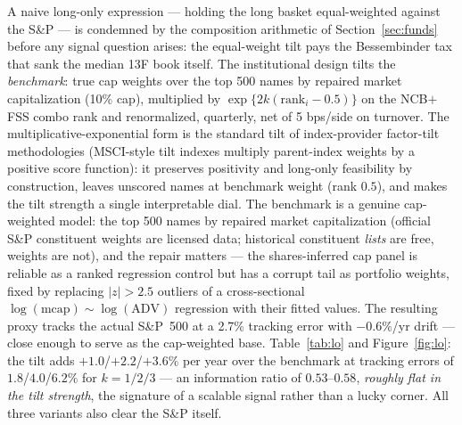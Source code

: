 A naive long-only expression --- holding the long basket
equal-weighted against the S\&P --- is condemned by the composition
arithmetic of Section~\ref{sec:funds} before any signal question
arises: the equal-weight tilt pays the Bessembinder tax that sank
the median 13F book itself. The institutional design tilts the
\emph{benchmark}: true cap weights over the top 500 names by
repaired market capitalization (10\% cap), multiplied by
$\exp\{2k(\mathrm{rank}_i - 0.5)\}$ on the NCB$+$FSS combo rank and
renormalized, quarterly, net of 5 bps/side on turnover. The
multiplicative-exponential form is the standard tilt of
index-provider factor-tilt methodologies (MSCI-style tilt indexes
multiply parent-index weights by a positive score function): it
preserves positivity and long-only feasibility by construction,
leaves unscored names at benchmark weight (rank $0.5$), and makes
the tilt strength a single interpretable dial.
The benchmark is a genuine cap-weighted model: the top 500 names by
repaired market capitalization (official S\&P constituent weights are
licensed data; historical constituent \emph{lists} are free, weights
are not), and the repair matters --- the shares-inferred cap panel
is reliable as a ranked regression control but has a corrupt tail as
portfolio weights, fixed by replacing $|z|>2.5$ outliers of a
cross-sectional $\log(\mathrm{mcap})\sim\log(\mathrm{ADV})$
regression with their fitted values. The resulting proxy tracks the
actual S\&P~500 at a 2.7\% tracking error with $-0.6\%$/yr drift ---
close enough to serve as the cap-weighted base. Table~\ref{tab:lo}
and Figure~\ref{fig:lo}: the tilt adds $+1.0$/$+2.2$/$+3.6\%$ per
year over the benchmark at tracking errors of
$1.8$/$4.0$/$6.2\%$ for $k=1/2/3$ --- an information ratio of
$0.53$--$0.58$, \emph{roughly flat in the tilt strength}, the
signature of a scalable signal rather than a lucky corner. All three
variants also clear the S\&P itself.

